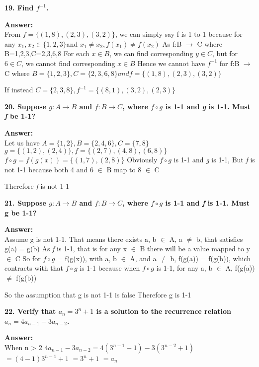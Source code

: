 \documentclass{article}
\begin{document}
\begin{large}
\textbf{19. Find $f^{-1}$.}

\textbf{Answer:} \\

From $f=\{(1,8),(2,3),(3,2)\}$, we can simply say f is 1-to-1 because for any $x_{1}, x_{2} \in \{1,2,3\} $and $x_{1} \neq x_{2}, f(x_{1}) \neq f(x_{2})$
As f:B $\to$ C where B={1,2,3},C={2,3,6,8}
For each $x \in B$, we can find corresponding $y \in C$, but for $6 \in C$, we cannot find corresponding $x \in B$
Hence we cannot have $f^{-1}$ for f:B $\to$ C where $B=\{1,2,3\},C=\{2,3,6,8\} and f=\{(1,8),(2,3),(3,2)\}$

If instead $C = \{2,3,8\}, f^{-1} = \{(8,1),(3,2),(2,3)\}$


\textbf{20. Suppose $g:A\to B$ and $f:B\to C$, where $f\circ g$ is 1-1 and \emph{g} is 1-1. Must \emph{f} be 1-1?}

\textbf{Answer:} \\

Let us have $A = \{1,2\}, B = \{2,4,6\}, C = \{7,8\}$
$g = \{(1,2), (2,4)\}, f = \{(2,7), (4,8), (6,8)\}$
$f\circ g = f(g(x)) = \{(1,7), (2,8)\}$
Obviously $f\circ g$ is 1-1 and \emph{g} is 1-1,
But \emph{f} is not 1-1 because both 4 and 6 $\in$ B map to 8 $\in$ C

Therefore \emph{f} is not 1-1


\textbf{21. Suppose $g:A\to B$ and $f:B\to C$, where $f\circ g$ is 1-1 and \emph{f} is 1-1. Must g be 1-1?}

\textbf{Answer:} \\

Assume g is not 1-1. That means there exists a, b $\in$ A, a $\neq$ b, that satisfies g(a) = g(b)
As \emph{f} is 1-1, that is for any x $\in$ B there will be a value mapped to y $\in$ C
So for $f\circ g$ = f(g(x)), with a, b $\in$ A, and a $\neq$ b, f(g(a)) = f(g(b)), which contracts with that $f\circ g$ is 1-1
because when $f\circ g$ is 1-1, for any a, b $\in$ A, f(g(a)) $\neq$ f(g(b))

So the assumption that g is not 1-1 is false
Therefore g is 1-1


\textbf{22. Verify that $a_{n}={3^{n}+1}$ is a solution to the recurrence relation $a_{n}=4a_{n-1}-3a_{n-2}$.}

\textbf{Answer:} \\

When n > 2
$4a_{n-1}-3a_{n-2} = 4 (3^{n-1} + 1) - 3 (3^{n-2} + 1)$
                    $= (4 - 1) 3^{n-1} + 1$
                    $= 3^{n} + 1$
                    $= a_{n}$


\end{large}
\end{document}
